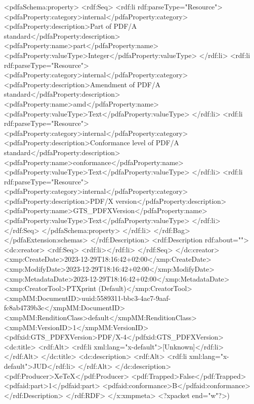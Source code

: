 {              <pdfaSchema:property>
                <rdf:Seq>
                  <rdf:li rdf:parseType="Resource">
                    <pdfaProperty:category>internal</pdfaProperty:category>
                    <pdfaProperty:description>Part of PDF/A standard</pdfaProperty:description>
                    <pdfaProperty:name>part</pdfaProperty:name>
                    <pdfaProperty:valueType>Integer</pdfaProperty:valueType>
                  </rdf:li>
                  <rdf:li rdf:parseType="Resource">
                    <pdfaProperty:category>internal</pdfaProperty:category>
                    <pdfaProperty:description>Amendment of PDF/A standard</pdfaProperty:description>
                    <pdfaProperty:name>amd</pdfaProperty:name>
                    <pdfaProperty:valueType>Text</pdfaProperty:valueType>
                  </rdf:li>
                  <rdf:li rdf:parseType="Resource">
                    <pdfaProperty:category>internal</pdfaProperty:category>
                    <pdfaProperty:description>Conformance level of PDF/A standard</pdfaProperty:description>
                    <pdfaProperty:name>conformance</pdfaProperty:name>
                    <pdfaProperty:valueType>Text</pdfaProperty:valueType>
                  </rdf:li>
                  <rdf:li rdf:parseType="Resource">
                    <pdfaProperty:category>internal</pdfaProperty:category>
                    <pdfaProperty:description>PDF/X version</pdfaProperty:description>
                    <pdfaProperty:name>GTS_PDFXVersion</pdfaProperty:name>
                    <pdfaProperty:valueType>Text</pdfaProperty:valueType>
                  </rdf:li>
                </rdf:Seq>
              </pdfaSchema:property>
            </rdf:li>
          </rdf:Bag>
        </pdfaExtension:schemas>
      </rdf:Description>
      <rdf:Description rdf:about="">
        <dc:creator>
          <rdf:Seq>
            <rdf:li></rdf:li>
          </rdf:Seq>
        </dc:creator>
        <xmp:CreateDate>2023-12-29T18:16:42+02:00</xmp:CreateDate>
        <xmp:ModifyDate>2023-12-29T18:16:42+02:00</xmp:ModifyDate>
        <xmp:MetadataDate>2023-12-29T18:16:42+02:00</xmp:MetadataDate>
        <xmp:CreatorTool>PTXprint (Default)</xmp:CreatorTool>
        <xmpMM:DocumentID>uuid:5589311-bbc3-4ac7-9aaf-fc8ab4739b3c</xmpMM:DocumentID>
        <xmpMM:RenditionClass>default</xmpMM:RenditionClass>
        <xmpMM:VersionID>1</xmpMM:VersionID>
        <pdfxid:GTS_PDFXVersion>PDF/X-4</pdfxid:GTS_PDFXVersion>
        <dc:title>
          <rdf:Alt>
            <rdf:li xml:lang="x-default">[Unknown]</rdf:li>
          </rdf:Alt>
        </dc:title>
        <dc:description>
          <rdf:Alt>
            <rdf:li xml:lang="x-default">JUD</rdf:li>
          </rdf:Alt>
        </dc:description>
        <pdf:Producer>XeTeX</pdf:Producer>
        <pdf:Trapped>False</pdf:Trapped>
      <pdfaid:part>1</pdfaid:part>
      <pdfaid:conformance>B</pdfaid:conformance>
      </rdf:Description>
  </rdf:RDF>
</x:xmpmeta>
<?xpacket end="w"?>)}
